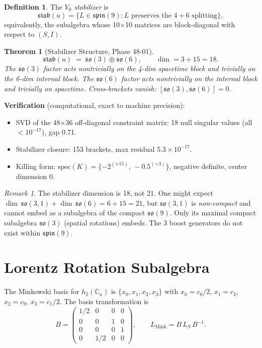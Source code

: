 \documentclass[11pt]{article}
\newtheorem{theorem}{Theorem}
\theoremstyle{definition}
\newtheorem{definition}{Definition}
\theoremstyle{remark}
\newtheorem{remark}{Remark}
\begin{document}
\begin{definition}
The \emph{$V_0$ stabilizer} is
\[
  \mathfrak{stab}(u)
  = \bigl\{L \in \mathfrak{spin}(9) :
    L \text{ preserves the } 4{+}6 \text{ splitting}\bigr\},
\]
equivalently, the subalgebra whose 10$\times$10 matrices are block-diagonal
with respect to $(S, I)$.
\end{definition}

\begin{theorem}[Stabilizer Structure, Phase 48-01]\label{thm:stab}
\[
  \mathfrak{stab}(u) \;=\; \mathfrak{so}(3) \oplus \mathfrak{so}(6),
  \qquad \dim = 3 + 15 = 18.
\]
The $\mathfrak{so}(3)$ factor acts nontrivially on the 4-dim spacetime
block and trivially on the 6-dim internal block.
The $\mathfrak{so}(6)$ factor acts nontrivially on the internal block
and trivially on spacetime.  Cross-brackets vanish:
$[\mathfrak{so}(3), \mathfrak{so}(6)] = 0$.
\end{theorem}

\noindent\textbf{Verification} (computational, exact to machine precision):
\begin{itemize}
  \item SVD of the 48$\times$36 off-diagonal constraint matrix:
    18 null singular values (all $< 10^{-17}$), gap 0.71.
  \item Stabilizer closure: 153 brackets, max residual $5.3 \times 10^{-17}$.
  \item Killing form: $\mathrm{spec}(K) = \{-2^{(\times 15)},\, -0.5^{(\times 3)}\}$,
    negative definite, center dimension 0.
\end{itemize}

\begin{remark}
The stabilizer dimension is 18, not 21.
One might expect $\dim\,\mathfrak{so}(3,1) + \dim\,\mathfrak{so}(6) = 6 + 15 = 21$,
but $\mathfrak{so}(3,1)$ is \emph{non-compact} and cannot embed as a
subalgebra of the compact $\mathfrak{so}(9)$.
Only its maximal compact subalgebra $\mathfrak{so}(3)$ (spatial rotations)
embeds.  The 3 boost generators do not exist within $\mathfrak{spin}(9)$.
\end{remark}

\section{Lorentz Rotation Subalgebra}

The Minkowski basis for $h_2(\mathbb{C}_u)$ is
$\{x_0, x_1, x_2, x_3\}$ with $x_0 = c_0/2$, $x_1 = c_2$,
$x_2 = c_9$, $x_3 = c_1/2$.  The basis transformation is
\begin{equation}\label{eq:basis-change}
  B = \begin{pmatrix} 1/2 & 0 & 0 & 0 \\
                       0 & 0 & 1 & 0 \\
                       0 & 0 & 0 & 1 \\
                       0 & 1/2 & 0 & 0 \end{pmatrix},
  \qquad
  L_{\mathrm{Mink}} = B\, L_S\, B^{-1}.
\end{equation}
\end{document}
